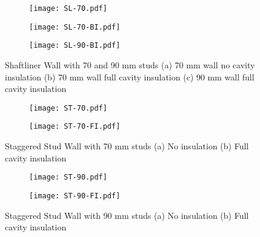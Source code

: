 \begin{figure}[!htbp]
	\centering
	\begin{subfigure}[b]{0.25\textwidth}
		\centering
		\texttt{[image: SL-70.pdf]}
		\caption{}
		\label{subfig:SL-70}
	\end{subfigure}
	\begin{subfigure}[b]{0.25\textwidth}
		\centering
		\texttt{[image: SL-70-BI.pdf]}
		\caption{}
		\label{subfig:SL-70-BI}
	\end{subfigure}
	\begin{subfigure}[b]{0.25\textwidth}
		\centering
		\texttt{[image: SL-90-BI.pdf]}
		\caption{}
		\label{subfig:SL-90-BI}
	\end{subfigure}
	   \caption{Shaftliner Wall with 70 and 90 mm studs (a) 70 mm wall no cavity insulation (b) 70 mm wall full cavity insulation (c) 90 mm wall full cavity insulation}
	   \label{fig:SL-70-90-parametric}
\end{figure} 
\begin{figure}[!htbp]
	\centering
	\begin{subfigure}[b]{0.35\textwidth}
		\centering
		\texttt{[image: ST-70.pdf]}
		\caption{}
		\label{subfig:ST-70}
	\end{subfigure}
	\begin{subfigure}[b]{0.35\textwidth}
		\centering
		\texttt{[image: ST-70-FI.pdf]}
		\caption{}
		\label{subfig:ST-70-FI}
	\end{subfigure}
	   \caption{Staggered Stud Wall with 70 mm studs (a) No insulation (b) Full cavity insulation}
	   \label{fig:ST-70-parametric}
\end{figure} 
\begin{figure}[!htbp]
	\centering
	\begin{subfigure}[b]{0.35\textwidth}
		\centering
		\texttt{[image: ST-90.pdf]}
		\caption{}
		\label{subfig:ST-90}
	\end{subfigure}
	\begin{subfigure}[b]{0.35\textwidth}
		\centering
		\texttt{[image: ST-90-FI.pdf]}
		\caption{}
		\label{subfig:ST-90-FI}
	\end{subfigure}
	   \caption{Staggered Stud Wall with 90 mm studs (a) No insulation (b) Full cavity insulation}
	   \label{fig:ST-90-parametric}
\end{figure} 

